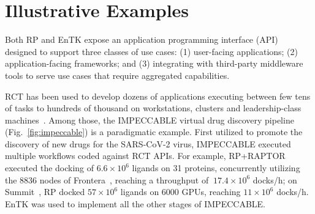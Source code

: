 \documentclass[preprint,12pt, a4paper]{elsarticle}
\begin{document}
\section{Illustrative Examples}\label{sec:examples}




Both RP and EnTK expose an application programming interface
(API)~\cite{rp-api-url,entk-api-url} designed to support three classes of use
cases: (1) user-facing applications; (2) application-facing frameworks; and (3)
integrating with third-party middleware tools to serve use cases that require
aggregated capabilities. 


RCT has been used to develop dozens of applications executing between few tens
of tasks to hundreds of thousand on workstations, clusters and leadership-class
machines~\cite{radical-pub-url}. Among those, the IMPECCABLE virtual drug
discovery pipeline~\cite{saadi2021impeccable} (Fig.~\ref{fig:impeccable}) is a
paradigmatic example. First utilized to promote the discovery of new drugs for
the SARS-CoV-2 virus, IMPECCABLE executed multiple workflows coded against RCT
APIs. For example, RP+RAPTOR executed the docking of $6.6\times10^6$ ligands on
31 proteins, concurrently utilizing the 8836 nodes of
Frontera~\cite{stanzione2020frontera}, reaching a throughput of
$~17.4\times10^6$ docks/h; on Summit~\cite{luo2020pre}, RP docked $57\times10^6$
ligands on 6000 GPUs, reaching $11\times10^6$ docks/h. EnTK was used to
implement all the other stages of IMPECCABLE\@.
\end{document}
